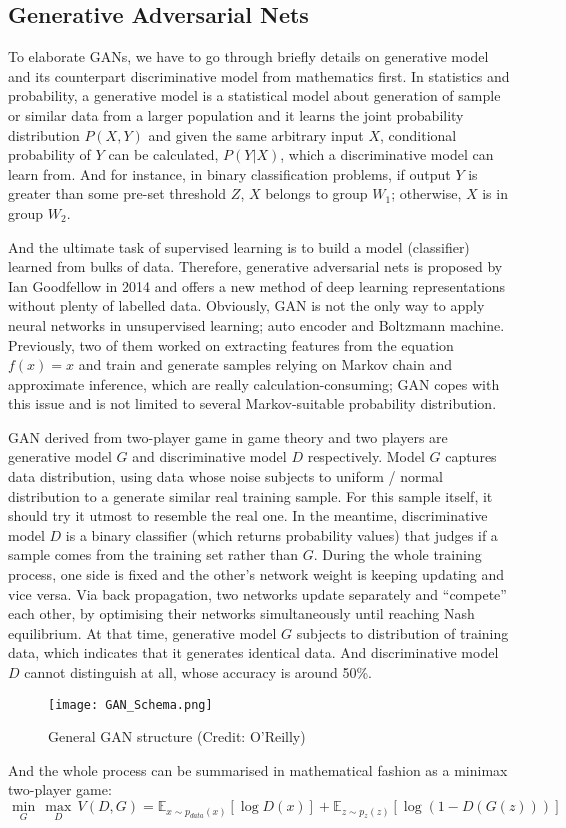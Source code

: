 \subsection{Generative Adversarial Nets}
To elaborate GANs, we have to go through briefly details on generative model and its counterpart discriminative model from mathematics first. In statistics and probability, a generative model is a statistical model about generation of sample or similar data from a larger population and it learns the joint probability distribution $ P(X, Y) $ and given the same arbitrary input $ X $, conditional probability of $ Y $ can be calculated, $ P(Y | X) $, which a discriminative model can learn from. And for instance, in binary classification problems, if output $ Y $ is greater than some pre-set threshold $ Z $, $ X $ belongs to group $ W_1 $; otherwise, $ X $ is in group $ W_2 $.

And the ultimate task of supervised learning is to build a model (classifier) learned from bulks of data. Therefore, generative adversarial nets is proposed by Ian Goodfellow in 2014\cite{goodfellow2014generative} and offers a new method of deep learning representations without plenty of labelled data. Obviously, GAN is not the only way to apply neural networks in unsupervised learning; auto encoder\cite[ch.~14]{Goodfellow-et-al-2016} and Boltzmann machine\cite[ch.~20]{Goodfellow-et-al-2016}. Previously, two of them worked on extracting features from the equation $ f(x) = x $ and train and generate samples relying on Markov chain and approximate inference\cite[ch.~20]{Goodfellow-et-al-2016}, which are really calculation-consuming; GAN copes with this issue and is not limited to several Markov-suitable probability distribution.

GAN derived from two-player game in game theory and two players are generative model $ G $ and discriminative model $ D $ respectively. Model $ G $ captures data distribution, using data whose noise subjects to uniform / normal distribution to a generate similar real training sample. For this sample itself, it should try it utmost to resemble the real one. In the meantime, discriminative model $ D $ is a binary classifier (which returns probability values) that judges if a sample comes from the training set rather than $ G $. During the whole training process, one side is fixed and the other's network weight is keeping updating and vice versa. Via back propagation, two networks update separately and ``compete'' each other, by optimising their networks simultaneously until reaching Nash equilibrium. At that time, generative model $ G $ subjects to distribution of training data, which indicates that it generates identical data. And discriminative model $ D $ cannot distinguish at all, whose accuracy is around 50\%.
\begin{figure}[h]
	\centering
	\texttt{[image: GAN\_Schema.png]}
	\caption{General GAN structure (Credit: O'Reilly)}
\end{figure}
And the whole process can be summarised in mathematical fashion as a minimax two-player game:
\[ \underset{G}{\min}\,{\underset{D}{\max}\,V(D, G)={\mathbb{E}_{x\sim{p_{data}(x)}}[\log{D(x)}]+\mathbb{E}_{z\sim{p_{z}(z)}}[\log{(1-D(G(z)))}]}} \]

